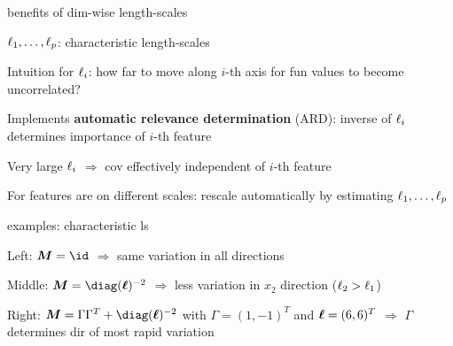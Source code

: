 \documentclass[11pt,compress,t,notes=noshow, xcolor=table]{beamer}
\begin{document}
\begin{framei}[sep=L]{benefits of dim-wise length-scales}
\item $\ell_1,\dots, \ell_p$: characteristic length-scales
\item Intuition for $\ell_i$: how far to move along $i$-th axis for fun values to become uncorrelated?
\item Implements \textbf{automatic relevance determination} (ARD): inverse of $\ell_i$ determines importance of $i$-th feature
\item Very large $\ell_i$ $\Rightarrow$ cov effectively independent of $i$-th feature
\item For features are on different scales: rescale automatically by estimating $\ell_1,\dots, \ell_p$ 
\end{framei}

\begin{framei}{examples: characteristic ls}
\item Left: $\bm{M} = \id$ $\Rightarrow$ same variation in all directions
\item Middle: $\bm{M} = \diag(\bm{\ls})^{-2}$ $\Rightarrow$ less variation in $x_2$ direction ($\ell_2 > \ell_1$)
\item Right: $\bm{M} = \Gamma \Gamma^T + \diag(\bm{\ls})^{-2}$ with $\Gamma = (1, -1)^T$ and $\bm{\ell} = (6, 6)^T$ $\Rightarrow$ $\Gamma$ determines dir of most rapid variation
\vfill
{}

\end{framei}

\endlecture
\end{document}
